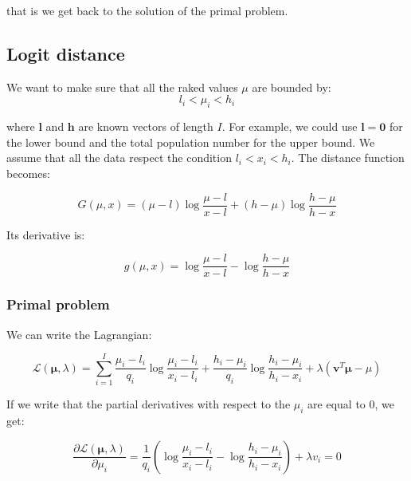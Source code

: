 \documentclass{tex/note}
\begin{document}
that is we get back to the solution of the primal problem.

\subsection{Logit distance}

We want to make sure that all the raked values $\mu$ are bounded by:
\begin{equation*}
l_i < \mu_i < h_i
\end{equation*}

where $\bm{l}$ and $\bm{h}$ are known vectors of length $I$. For example, we could use $\bm{l} = \bm{0}$ for the lower bound and the total population number for the upper bound. We assume that all the data respect the condition $l_i < x_i < h_i$. The distance function becomes:

\begin{equation*}
G \left( \mu , x \right) = \left( \mu - l  \right) \log \frac{\mu - l}{x - l} + \left( h - \mu \right) \log \frac{h - \mu}{h - x}
\end{equation*}

Its derivative is:

\begin{equation*}
g \left( \mu , x \right) = \log \frac{\mu - l}{x - l} - \log \frac{h - \mu}{h - x}
\end{equation*}

\subsubsection{Primal problem}

We can write the Lagrangian:

\begin{equation*}
\mathcal{L} \left( \bm{\mu} , \lambda \right) = \sum_{i = 1}^I \frac{\mu_i - l_i}{q_i} \log \frac{\mu_i - l_i}{x_i - l_i} + \frac{h_i - \mu_i}{q_i} \log \frac{h_i - \mu_i}{h_i - x_i} + \lambda \left( \bm{v}^T \bm{\mu} - \mu \right)
\end{equation*}

If we write that the partial derivatives with respect to the $\mu_i$ are equal to $0$, we get:

\begin{equation*}
\frac{\partial \mathcal{L} \left( \bm{\mu} , \lambda \right)}{\partial \mu_i} = \frac{1}{q_i} \left( \log \frac{\mu_i - l_i}{x_i - l_i} - \log \frac{h_i - \mu_i}{h_i - x_i} \right) + \lambda v_i = 0
\end{equation*}
\end{document}
